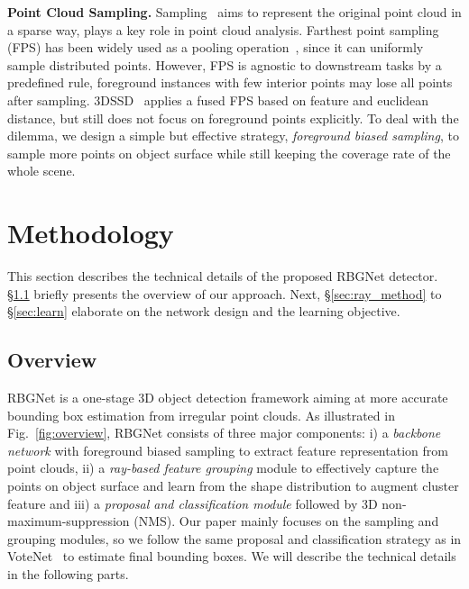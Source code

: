 \documentclass[final]{cvpr}
\begin{document}
\noindent \textbf{Point Cloud Sampling.} Sampling~\cite{nezhadarya2020adaptive, lang2020samplenet, oren2018learnsp} aims to represent the original point cloud in a sparse way, plays a key role in point cloud analysis. Farthest point sampling (FPS) has been widely used as a pooling operation~\cite{qi2018pointnnetplus, qi2019deep}, since it can uniformly sample distributed points. However, FPS is agnostic to downstream tasks by a predefined rule, foreground instances with few interior points may lose all points after sampling. 3DSSD~\cite{yang20203dssd} applies a fused FPS based on feature and euclidean distance, but still does not focus on foreground points explicitly. To deal with the dilemma, we design a simple but effective strategy, \textit{foreground biased sampling}, to sample more points on object surface while still keeping the coverage rate of the whole scene.  
\vspace{-1pt}
\section{Methodology}

This section describes the technical details of the proposed RBGNet detector. \S \ref{sec:overview} briefly presents the overview of our approach. Next, \S \ref{sec:ray_method} to \S \ref{sec:learn} elaborate on the network design and the learning objective. 

\subsection{Overview} \label{sec:overview}
RBGNet is a one-stage 3D object detection framework aiming at more accurate bounding box estimation from irregular point clouds. As illustrated in Fig.~\ref{fig:overview}, RBGNet consists of three major components: i) a \textit{backbone network} with foreground biased sampling to extract feature representation from point clouds, ii) a \textit{ray-based feature grouping} module to effectively capture the points on object surface and learn from the shape distribution to augment cluster feature and iii) a \textit{proposal and classification module} followed by 3D non-maximum-suppression (NMS). Our paper mainly focuses on the sampling and grouping modules, so we follow the same proposal and classification strategy as in VoteNet~\cite{qi2019deep} to estimate final bounding boxes. We will describe the technical details in the following parts.
\end{document}
